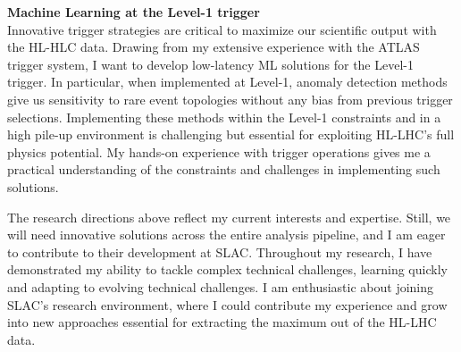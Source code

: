 \documentclass[11pt, a4paper]{awesome-cv}
\begin{document}
\begin{cvletter}
  \textbf{Machine Learning at the Level-1 trigger}\\
  Innovative trigger strategies are critical to maximize our scientific output with the HL-HLC data. Drawing from my extensive experience with the ATLAS trigger system, I want to develop low-latency ML solutions for the Level-1 trigger. In particular, when implemented at Level-1, anomaly detection methods give us sensitivity to rare event topologies without any bias from previous trigger selections. Implementing these methods within the Level-1 constraints and in a high pile-up environment is challenging but essential for exploiting HL-LHC's full physics potential. My hands-on experience with trigger operations gives me a practical understanding of the constraints and challenges in implementing such solutions.
  
  The research directions above reflect my current interests and expertise. Still, we will need innovative solutions across the entire analysis pipeline, and I am eager to contribute to their development at SLAC. Throughout my research, I have demonstrated my ability to tackle complex technical challenges, learning quickly and adapting to evolving technical challenges. I am enthusiastic about joining SLAC's research environment, where I could contribute my experience and grow into new approaches essential for extracting the maximum out of the HL-LHC data.

\end{cvletter}

\makeletterclosing
\end{document}

